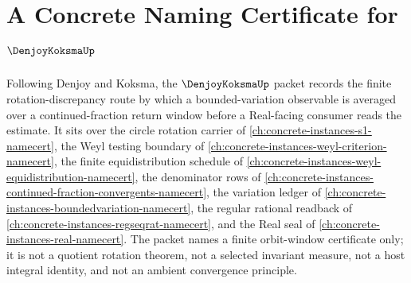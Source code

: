 \chapter{A Concrete Naming Certificate for $\DenjoyKoksmaUp$}
\label{ch:concrete-instances-denjoy-koksma-namecert}

Following Denjoy and Koksma, the $\DenjoyKoksmaUp$ packet records the finite rotation-discrepancy route by which a bounded-variation observable is averaged over a continued-fraction return window before a Real-facing consumer reads the estimate. It sits over the circle rotation carrier of \autoref{ch:concrete-instances-s1-namecert}, the Weyl testing boundary of \autoref{ch:concrete-instances-weyl-criterion-namecert}, the finite equidistribution schedule of \autoref{ch:concrete-instances-weyl-equidistribution-namecert}, the denominator rows of \autoref{ch:concrete-instances-continued-fraction-convergents-namecert}, the variation ledger of \autoref{ch:concrete-instances-boundedvariation-namecert}, the regular rational readback of \autoref{ch:concrete-instances-regseqrat-namecert}, and the Real seal of \autoref{ch:concrete-instances-real-namecert}. The packet names a finite orbit-window certificate only; it is not a quotient rotation theorem, not a selected invariant measure, not a host integral identity, and not an ambient convergence principle.

